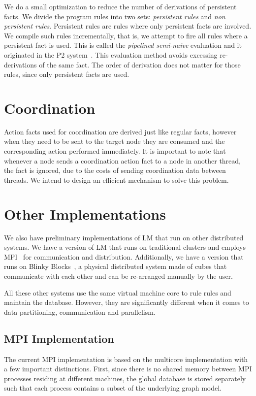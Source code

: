 We do a small optimization to reduce the number of derivations of persistent facts. We
divide the program rules into two sets: \emph{persistent rules} and \emph{non persistent rules}.
Persistent rules are rules where only persistent facts are involved. We compile such rules
incrementally, that is, we attempt to fire all rules where a persistent fact is used. This is called
the \emph{pipelined semi-naive} evaluation and it originated in the P2 system~\cite{Loo-condie-garofalakis-p2}.
This evaluation method avoids excessing re-derivations of the same fact. The order of derivation does not matter for those rules, since
only persistent facts are used.

\section{Coordination}

Action facts used for coordination are derived just like regular facts, however when they need to be sent to the target node
they are consumed and the corresponding action performed immediately.
It is important to note that whenever a node sends a coordination action fact to a node in another thread,
the fact is ignored, due to the costs of sending
coordination data between threads. We intend to design an efficient mechanism to solve this problem.

\section{Other Implementations}

We also have preliminary implementations of LM that run on other distributed systems.
We have a version of LM that runs on traditional clusters and employs MPI~\cite{gabriel04-open-mpi} for communication
and distribution. Additionally, we have a version that runs on Blinky Blocks~\cite{Kirby-chi11}, a physical distributed system
made of cubes that communicate with each other and can be re-arranged manually by the user.

All these other systems use the same virtual machine core to rule rules and maintain the database. However, they are significantly different
when it comes to data partitioning, communication and parallelism.

\subsection{MPI Implementation}

The current MPI implementation is based on the multicore implementation with a few important distinctions. First, since there is no shared
memory between MPI processes residing at different machines, the global database is stored separately such that each process contains a subset
of the underlying graph model.

